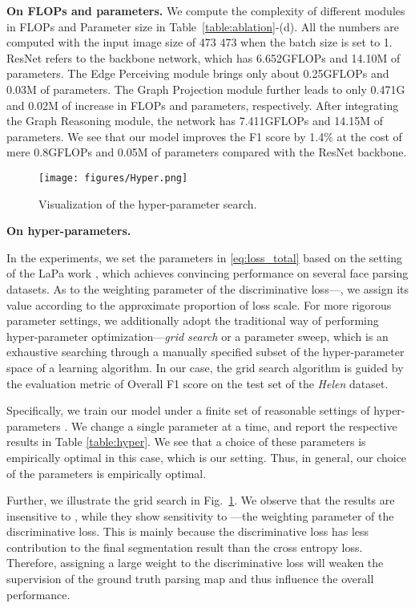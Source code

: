 \textbf{On FLOPs and parameters.} 
We compute the complexity of different modules in FLOPs and Parameter size in Table~\ref{table:ablation}-(d). 
All the numbers are computed with the input image size of 473  473 when the batch size is set to 1.
ResNet refers to the backbone network, which has 6.652GFLOPs and 14.10M of parameters. The Edge Perceiving module brings only about 0.25GFLOPs and 0.03M of parameters. 
The Graph Projection module further leads to only 0.471G and 0.02M of increase in FLOPs and parameters, respectively. After integrating the Graph Reasoning module, the network has 7.411GFLOPs and 14.15M of parameters. 
We see that our model improves the F1 score by 1.4\% at the cost of mere 0.8GFLOPs and 0.05M of parameters compared with the ResNet backbone.  

\begin{figure}[htbp]
    \centering
    \texttt{[image: figures/Hyper.png]}
    \caption{Visualization of the hyper-parameter search.}
    \label{fig:hyper}
\end{figure}


\textbf{On hyper-parameters.}

In the experiments, we set the parameters  in \eqref{eq:loss_total} based on the setting of the LaPa work \cite{liu2020new}, which achieves convincing performance on several face parsing datasets. As to the weighting parameter of the discriminative loss---, we assign its value according to the approximate proportion of loss scale.
For more rigorous parameter settings, we additionally adopt the traditional way of performing hyper-parameter optimization---{\it grid search} or a parameter sweep, which is an exhaustive searching through a manually specified subset of the hyper-parameter space of a learning algorithm. 
In our case, the grid search algorithm is guided by the evaluation metric of Overall F1 score on the test set of the {\it Helen} dataset. 

Specifically, we train our model under a finite set of reasonable settings of hyper-parameters . We change a single parameter at a time, and report the respective results in Table \ref{table:hyper}. 
We see that a choice of these parameters  is empirically optimal in this case, which is our setting. Thus, in general, our choice of the parameters is empirically optimal.

Further, we illustrate the grid search in Fig.~\ref{fig:hyper}. 
We observe that the results are insensitive to , while they show sensitivity to ---the weighting parameter of the discriminative loss. This is mainly because the discriminative loss has less contribution to the final segmentation result than the cross entropy loss. 
Therefore, assigning a large weight to the discriminative loss will weaken the supervision of the ground truth parsing map and thus influence the overall performance.

